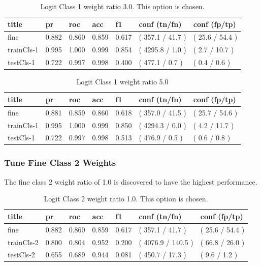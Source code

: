 \documentclass[ms]{nuthesis}
\begin{document}
\FloatBarrier
\begin{table}[H]
\centering
\caption{Logit Class 1 weight ratio 3.0. This option is chosen.}
\label{tab:LogRegCls1-Wt3}
\begin{tabular}{|l||l||l||l||l||l||l|}\toprule
title & pr & roc & acc & f1 & conf (tn/fn) & conf (fp/tp) \\ \midrule
fine & 0.882 & 0.860 & 0.859 & 0.617 & ( 357.1 / 41.7 ) & ( 25.6 / 54.4 ) \\
trainCls-1 & 0.995 & 1.000 & 0.999 & 0.854 & ( 4295.8 / 1.0 ) & ( 2.7 / 10.7 ) \\
testCls-1 & 0.722 & 0.997 & 0.998 & 0.400 & ( 477.1 / 0.7 ) & ( 0.4 / 0.6 ) \\ \bottomrule
\end{tabular}
\end{table}
\FloatBarrier

\FloatBarrier
\begin{table}[H]
\centering
\caption{Logit Class 1 weight ratio 5.0}
\label{tab:LogRegCls1-Wt5}
\begin{tabular}{|l||l||l||l||l||l||l|}\toprule
title & pr & roc & acc & f1 & conf (tn/fn) & conf (fp/tp) \\ \midrule
fine & 0.881 & 0.859 & 0.860 & 0.618 & ( 357.0 / 41.5 ) & ( 25.7 / 54.6 ) \\
trainCls-1 & 0.995 & 1.000 & 0.999 & 0.850 & ( 4294.3 / 0.0 ) & ( 4.2 / 11.7 ) \\
testCls-1 & 0.722 & 0.997 & 0.998 & 0.513 & ( 476.9 / 0.5 ) & ( 0.6 / 0.8 ) \\ \bottomrule
\end{tabular}
\end{table}
\FloatBarrier


\subsubsection{Tune Fine Class 2 Weights}
\par The fine class 2 weight ratio of 1.0 is discovered to have the highest performance.
\FloatBarrier
\begin{table}[H]
\centering
\caption{Logit Class 2 weight ratio 1.0. This option is chosen.}
\label{tab:LogRegCls2-Wt1}
\begin{tabular}{|l||l||l||l||l||l||l|}\toprule
title & pr & roc & acc & f1 & conf (tn/fn) & conf (fp/tp) \\ \midrule
fine & 0.882 & 0.860 & 0.859 & 0.617 & ( 357.1 / 41.7 ) & ( 25.6 / 54.4 ) \\
trainCls-2 & 0.800 & 0.804 & 0.952 & 0.200 & ( 4076.9 / 140.5 ) & ( 66.8 / 26.0 ) \\
testCls-2 & 0.655 & 0.689 & 0.944 & 0.081 & ( 450.7 / 17.3 ) & ( 9.6 / 1.2 ) \\ \bottomrule
\end{tabular}
\end{table}
\FloatBarrier
\end{document}
